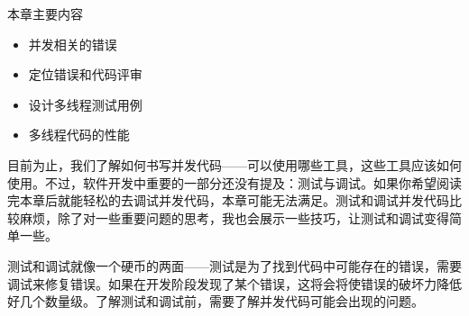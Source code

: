 
本章主要内容

\begin{itemize}
    \item 并发相关的错误
    \item 定位错误和代码评审
    \item 设计多线程测试用例
    \item 多线程代码的性能
\end{itemize}

目前为止，我们了解如何书写并发代码——可以使用哪些工具，这些工具应该如何使用。不过，软件开发中重要的一部分还没有提及：测试与调试。如果你希望阅读完本章后就能轻松的去调试并发代码，本章可能无法满足。测试和调试并发代码比较麻烦，除了对一些重要问题的思考，我也会展示一些技巧，让测试和调试变得简单一些。

测试和调试就像一个硬币的两面——测试是为了找到代码中可能存在的错误，需要调试来修复错误。如果在开发阶段发现了某个错误，这将会将使错误的破坏力降低好几个数量级。了解测试和调试前，需要了解并发代码可能会出现的问题。
